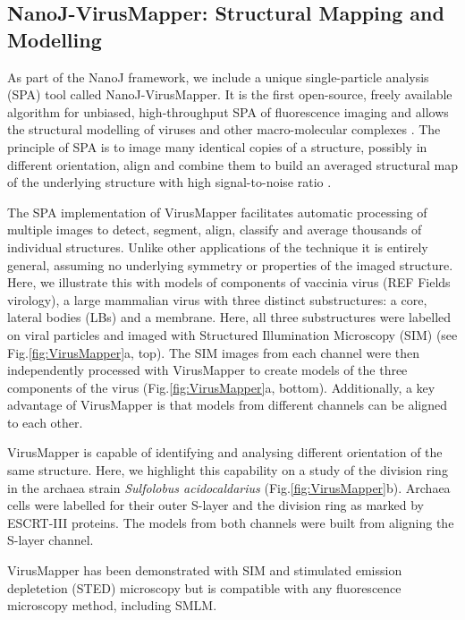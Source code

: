 \subsection*{NanoJ-VirusMapper: Structural Mapping and Modelling}
 As part of the NanoJ framework, we include a unique single-particle analysis (SPA) tool called NanoJ-VirusMapper. It is the first open-source, freely available algorithm for unbiased, high-throughput SPA of fluorescence imaging and allows the structural modelling of viruses and other macro-molecular complexes \cite{gray2016virusmapper,gray2017open,gray2018nanoscale}. The principle of SPA is to image many identical copies of a structure, possibly in different orientation, align and combine them to build an averaged structural map of the underlying structure with high signal-to-noise ratio \cite{Szymborska2013,laine2015structural,lelek2012superresolution} . 

 The SPA implementation of VirusMapper facilitates automatic processing of multiple images to detect, segment, align, classify and average thousands of individual structures. Unlike other applications of the technique it is entirely general, assuming no underlying symmetry or properties of the imaged structure. Here, we illustrate this with models of components of vaccinia virus (REF Fields virology), a large mammalian virus with three distinct substructures: a core, lateral bodies (LBs) and a membrane. Here, all three substructures were labelled on viral particles and imaged with Structured Illumination Microscopy (SIM) \cite{gustafsson2000surpassing} (see Fig.\ref{fig:VirusMapper}a, top). The SIM images from each channel were then independently processed with VirusMapper to create models of the three components of the virus (Fig.\ref{fig:VirusMapper}a, bottom). Additionally, a key advantage of VirusMapper is that models from different channels can be aligned to each other.

 VirusMapper is capable of identifying and analysing different orientation of the same structure. Here, we highlight this capability on a study of the division ring in the archaea strain \emph{Sulfolobus acidocaldarius} (Fig.\ref{fig:VirusMapper}b). Archaea cells were labelled for their outer S-layer and the division ring as marked by ESCRT-III proteins. The models from both channels were built from aligning the S-layer channel.

 VirusMapper has been demonstrated with SIM and stimulated emission depletetion (STED) microscopy \cite{Gray2016} but is compatible with any fluorescence microscopy method, including SMLM.


